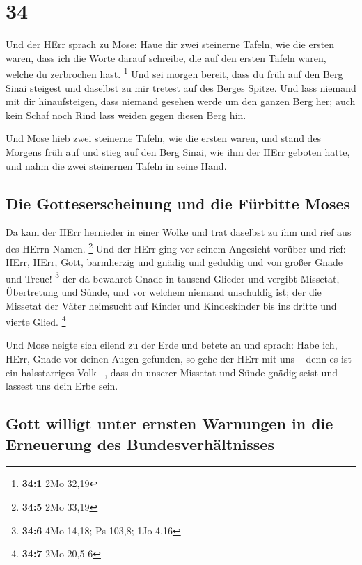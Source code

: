 \hypertarget{section-33}{%
\section{34}\label{section-33}}

 Und der HErr sprach zu Mose: Haue dir zwei steinerne
Tafeln, wie die ersten waren, dass ich die Worte darauf schreibe, die
auf den ersten Tafeln waren, welche du zerbrochen hast. \footnote{\textbf{34:1}
  2Mo 32,19}  Und sei morgen bereit, dass du früh auf den
Berg Sinai steigest und daselbst zu mir tretest auf des Berges Spitze.
 Und lass niemand mit dir hinaufsteigen, dass niemand
gesehen werde um den ganzen Berg her; auch kein Schaf noch Rind lass
weiden gegen diesen Berg hin.

 Und Mose hieb zwei steinerne Tafeln, wie die ersten
waren, und stand des Morgens früh auf und stieg auf den Berg Sinai, wie
ihm der HErr geboten hatte, und nahm die zwei steinernen Tafeln in seine
Hand.

\hypertarget{die-gotteserscheinung-und-die-fuxfcrbitte-moses}{%
\subsection{Die Gotteserscheinung und die Fürbitte
Moses}\label{die-gotteserscheinung-und-die-fuxfcrbitte-moses}}

 Da kam der HErr hernieder in einer Wolke und trat
daselbst zu ihm und rief aus des HErrn Namen. \footnote{\textbf{34:5}
  2Mo 33,19}  Und der HErr ging vor seinem Angesicht
vorüber und rief: HErr, HErr, Gott, barmherzig und gnädig und geduldig
und von großer Gnade und Treue! \footnote{\textbf{34:6} 4Mo 14,18; Ps
  103,8; 1Jo 4,16}  der da bewahret Gnade in tausend
Glieder und vergibt Missetat, Übertretung und Sünde, und vor welchem
niemand unschuldig ist; der die Missetat der Väter heimsucht auf Kinder
und Kindeskinder bis ins dritte und vierte Glied. \footnote{\textbf{34:7}
  2Mo 20,5-6}

 Und Mose neigte sich eilend zu der Erde und betete an
 und sprach: Habe ich, HErr, Gnade vor deinen Augen
gefunden, so gehe der HErr mit uns -- denn es ist ein halsstarriges Volk
--, dass du unserer Missetat und Sünde gnädig seist und lassest uns dein
Erbe sein.

\hypertarget{gott-willigt-unter-ernsten-warnungen-in-die-erneuerung-des-bundesverhuxe4ltnisses}{%
\subsection{Gott willigt unter ernsten Warnungen in die Erneuerung des
Bundesverhältnisses}\label{gott-willigt-unter-ernsten-warnungen-in-die-erneuerung-des-bundesverhuxe4ltnisses}}

